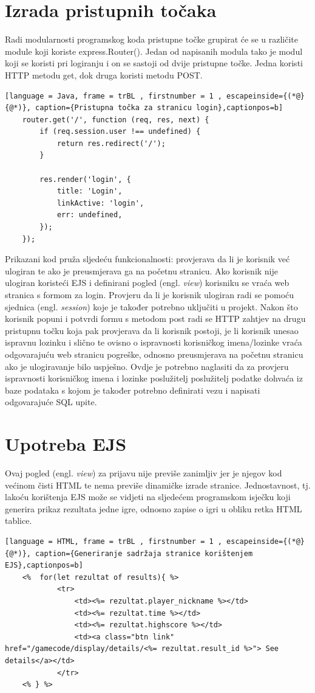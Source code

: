 \documentclass[times, utf8, zavrsni, numeric]{fer}
\begin{document}
	\section{Izrada pristupnih točaka}
	Radi modularnosti programskog koda  pristupne točke grupirat će se u različite module koji koriste express.Router(). Jedan od napisanih modula tako je modul koji se koristi pri logiranju i on se sastoji od dvije pristupne točke. 
	Jedna koristi HTTP metodu get, dok druga koristi metodu POST.
	\renewcommand{\lstlistingname}{Kôd}
	\begin{lstlisting}[language = Java, frame = trBL , firstnumber = 1 , escapeinside={(*@}{@*)}, caption={Pristupna točka za stranicu login},captionpos=b]
	router.get('/', function (req, res, next) {
		if (req.session.user !== undefined) {
			return res.redirect('/');
		}

		res.render('login', {
			title: 'Login',
			linkActive: 'login',
			err: undefined,
		});
	});
	\end{lstlisting}
	
	Prikazani kod pruža sljedeću funkcionalnosti: provjerava da li je korisnik već ulogiran te ako je preusmjerava ga na početnu stranicu. Ako korisnik nije ulogiran koristeći EJS i definirani pogled (engl. \textit{view}) korisniku se vraća
	web stranica s formom za login. Provjeru da li je korisnik ulogiran radi se pomoću sjednica (engl. \textit{session}) koje je također potrebno uključiti u projekt. Nakon što korisnik popuni i potvrdi formu s metodom post radi se HTTP zahtjev 
	na drugu pristupnu točku koja pak provjerava da li korisnik postoji, je li korisnik unesao ispravnu lozinku i slično te ovisno o ispravnosti korisničkog imena/lozinke vraća odgovarajuću web stranicu pogreške, odnosno preusmjerava na početnu stranicu
	ako je ulogiravanje bilo uspješno. Ovdje je potrebno naglasiti da za provjeru ispravnosti korisničkog imena i lozinke poslužitelj poslužitelj podatke dohvaća iz baze podataka s kojom je također potrebno definirati vezu i napisati odgovarajuće SQL
	upite. 
	

	\section{Upotreba EJS}
	Ovaj pogled (engl. \textit{view}) za prijavu nije previše zanimljiv jer je njegov kod većinom čisti HTML te nema previše dinamičke izrade stranice. Jednostavnost, tj. lakoću korištenja EJS može se vidjeti na sljedećem programskom isječku koji 
	generira prikaz rezultata jedne igre, odnosno zapise o igri u obliku retka HTML tablice.
	\renewcommand{\lstlistingname}{Kôd}
	\begin{lstlisting}[language = HTML, frame = trBL , firstnumber = 1 , escapeinside={(*@}{@*)}, caption={Generiranje sadržaja stranice korištenjem EJS},captionpos=b]
	<% 	for(let rezultat of results){ %>
			<tr>
				<td><%= rezultat.player_nickname %></td>
				<td><%= rezultat.time %></td>
				<td><%= rezultat.highscore %></td>
				<td><a class="btn link" href="/gamecode/display/details/<%= rezultat.result_id %>"> See details</a></td>
            </tr>
	<% } %>
	\end{lstlisting}
	
\end{document}
